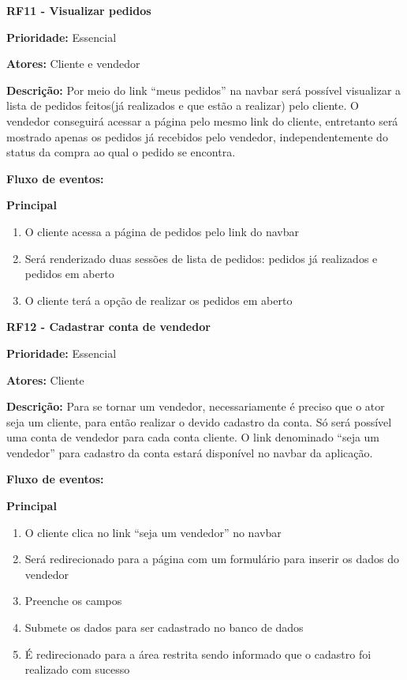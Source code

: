 \textbf{RF11 - Visualizar pedidos} \par
\textbf{Prioridade:} Essencial \par
\textbf{Atores:} Cliente e vendedor \par
\textbf{Descrição:} Por meio do link “meus pedidos” na navbar será possível visualizar a lista de pedidos feitos(já realizados e que estão a realizar) pelo cliente. O vendedor conseguirá acessar a página pelo mesmo link do cliente, entretanto será mostrado apenas os pedidos já recebidos pelo vendedor, independentemente do status da compra ao qual o pedido se encontra. \par
\textbf{Fluxo de eventos:} \par
\textbf{Principal} \par
\begin{enumerate}
  \item O cliente acessa a página de pedidos pelo link do navbar
  \item Será renderizado duas sessões de lista de pedidos: pedidos já realizados e pedidos em aberto
  \item O cliente terá a opção de realizar os pedidos em aberto
\end{enumerate}

\textbf{RF12 - Cadastrar conta de vendedor} \par
\textbf{Prioridade:} Essencial \par
\textbf{Atores:} Cliente \par
\textbf{Descrição:} Para se tornar um vendedor, necessariamente é preciso que o ator seja um cliente, para então realizar o devido cadastro da conta. Só será possível uma conta de vendedor para cada conta cliente. O link denominado “seja um vendedor” para cadastro da conta estará disponível no navbar da aplicação. \par
\textbf{Fluxo de eventos:} \par
\textbf{Principal} \par
\begin{enumerate}
  \item O cliente clica no link “seja um vendedor” no navbar
  \item Será redirecionado para a página com um formulário para inserir os dados do vendedor
  \item Preenche os campos
  \item Submete os dados para ser cadastrado no banco de dados
  \item É redirecionado para a área restrita sendo informado que o cadastro foi realizado com sucesso
\end{enumerate}

